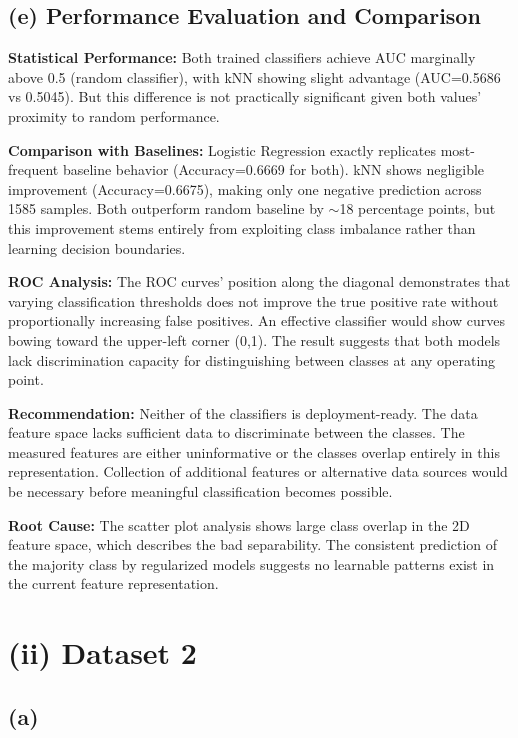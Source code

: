 \documentclass[11pt,a4paper]{article}
\begin{document}
\subsection*{(e) Performance Evaluation and Comparison}

\textbf{Statistical Performance:} Both trained classifiers achieve AUC marginally above 0.5 (random classifier), with kNN showing slight advantage (AUC=0.5686 vs 0.5045). But this difference is not practically significant given both values' proximity to random performance.

\textbf{Comparison with Baselines:} Logistic Regression exactly replicates most-frequent baseline behavior (Accuracy=0.6669 for both). kNN shows negligible improvement (Accuracy=0.6675), making only one negative prediction across 1585 samples. Both outperform random baseline by $\sim$18 percentage points, but this improvement stems entirely from exploiting class imbalance rather than learning decision boundaries.

\textbf{ROC Analysis:} The ROC curves' position along the diagonal demonstrates that varying classification thresholds does not improve the true positive rate without proportionally increasing false positives. An effective classifier would show curves bowing toward the upper-left corner (0,1). The result suggests that both models lack discrimination capacity for distinguishing between classes at any operating point.

\textbf{Recommendation:} Neither of the classifiers is deployment-ready. The data feature space lacks sufficient data to discriminate between the classes. The measured features are either uninformative or the classes overlap entirely in this representation. Collection of additional features or alternative data sources would be necessary before meaningful classification becomes possible.

\textbf{Root Cause:} The scatter plot analysis shows large class overlap in the 2D feature space, which describes the bad separability. The consistent prediction of the majority class by regularized models suggests no learnable patterns exist in the current feature representation.

\section*{(ii) Dataset 2}

\subsection*{(a)}
\end{document}
